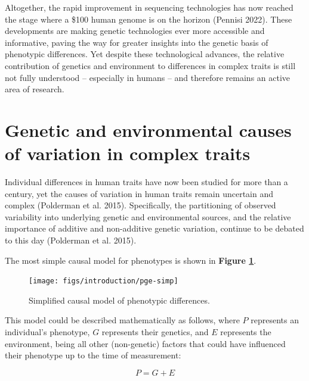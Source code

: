 \documentclass[
]{book}
\begin{document}
Altogether, the rapid improvement in sequencing technologies has now reached the stage where a \$100 human genome is on the horizon (Pennisi 2022). These developments are making genetic technologies ever more accessible and informative, paving the way for greater insights into the genetic basis of phenotypic differences. Yet despite these technological advances, the relative contribution of genetics and environment to differences in complex traits is still not fully understood -- especially in humans -- and therefore remains an active area of research.

\hypertarget{genetic-and-environmental-causes-of-variation-in-complex-traits}{%
\section{Genetic and environmental causes of variation in complex traits}\label{genetic-and-environmental-causes-of-variation-in-complex-traits}}

Individual differences in human traits have now been studied for more than a century, yet the causes of variation in human traits remain uncertain and complex (Polderman et al. 2015). Specifically, the partitioning of observed variability into underlying genetic and environmental sources, and the relative importance of additive and non-additive genetic variation, continue to be debated to this day (Polderman et al. 2015).

The most simple causal model for phenotypes is shown in \textbf{Figure \ref{fig:pge-simp}}.



\begin{figure}

{\centering \texttt{[image: figs/introduction/pge-simp]} 

}

\caption{Simplified causal model of phenotypic differences.}\label{fig:pge-simp}
\end{figure}

This model could be described mathematically as follows, where \(P\) represents an individual's phenotype, \(G\) represents their genetics, and \(E\) represents the environment, being all other (non-genetic) factors that could have influenced their phenotype up to the time of measurement:

\begin{equation}
P = G + E \label{eq:pge-simp}
\end{equation}
\end{document}
